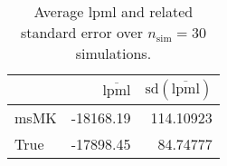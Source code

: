 \begin{table}[H]

\caption{Average lpml and related standard error over $n_{\text{sim}} = 30$ simulations.}
\centering
\begin{tabular}[t]{lrr}
\toprule
  & $\overbar{\text{lpml}}$ & $\text{sd}(\overbar{\text{lpml}})$\\
\midrule
msMK & -18168.19 & 114.10923\\
True & -17898.45 & 84.74777\\
\bottomrule
\end{tabular}
\end{table}